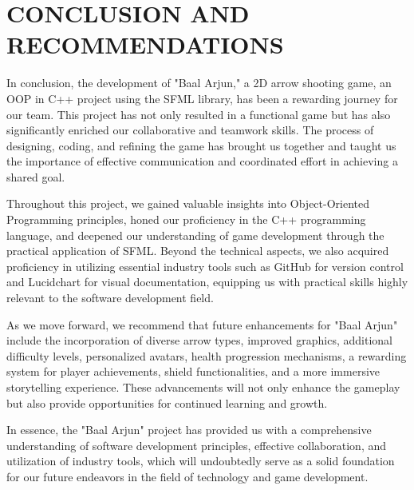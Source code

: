 \section{CONCLUSION AND RECOMMENDATIONS}
In conclusion, the development of "Baal Arjun," a 2D arrow shooting game, an OOP in C++ project using the SFML library, has been a rewarding journey for our team. This project has not only resulted in a functional game but has also significantly enriched our collaborative and teamwork skills. The process of designing, coding, and refining the game has brought us together and taught us the importance of effective communication and coordinated effort in achieving a shared goal.

Throughout this project, we gained valuable insights into Object-Oriented Programming principles, honed our proficiency in the C++ programming language, and deepened our understanding of game development through the practical application of SFML. Beyond the technical aspects, we also acquired proficiency in utilizing essential industry tools such as GitHub for version control and Lucidchart for visual documentation, equipping us with practical skills highly relevant to the software development field.

As we move forward, we recommend that future enhancements for "Baal Arjun" include the incorporation of diverse arrow types, improved graphics, additional difficulty levels, personalized avatars, health progression mechanisms, a rewarding system for player achievements, shield functionalities, and a more immersive storytelling experience. These advancements will not only enhance the gameplay but also provide opportunities for continued learning and growth.

In essence, the "Baal Arjun" project has provided us with a comprehensive understanding of software development principles, effective collaboration, and utilization of industry tools, which will undoubtedly serve as a solid foundation for our future endeavors in the field of technology and game development.

\newpage